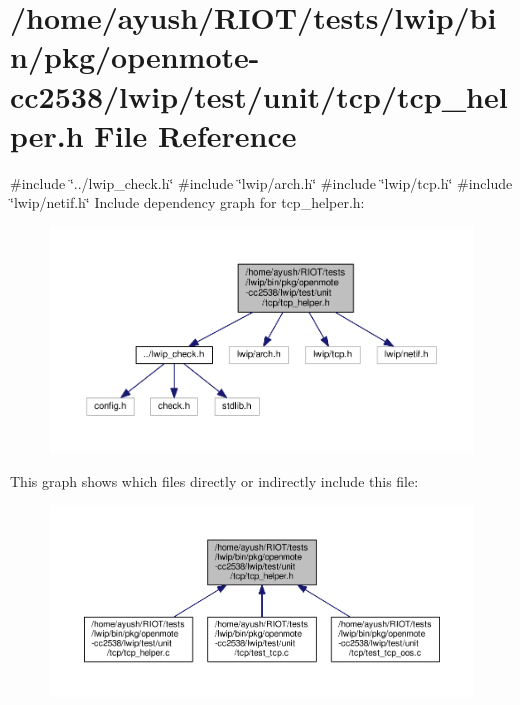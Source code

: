 \hypertarget{openmote-cc2538_2lwip_2test_2unit_2tcp_2tcp__helper_8h}{}\section{/home/ayush/\+R\+I\+O\+T/tests/lwip/bin/pkg/openmote-\/cc2538/lwip/test/unit/tcp/tcp\+\_\+helper.h File Reference}
\label{openmote-cc2538_2lwip_2test_2unit_2tcp_2tcp__helper_8h}
{\ttfamily \#include \char`\"{}../lwip\+\_\+check.\+h\char`\"{}}\newline
{\ttfamily \#include \char`\"{}lwip/arch.\+h\char`\"{}}\newline
{\ttfamily \#include \char`\"{}lwip/tcp.\+h\char`\"{}}\newline
{\ttfamily \#include \char`\"{}lwip/netif.\+h\char`\"{}}\newline
Include dependency graph for tcp\+\_\+helper.\+h\+:
\nopagebreak
\begin{figure}[H]
\begin{center}
\leavevmode
\includegraphics[width=350pt]{openmote-cc2538_2lwip_2test_2unit_2tcp_2tcp__helper_8h__incl}
\end{center}
\end{figure}
This graph shows which files directly or indirectly include this file\+:
\nopagebreak
\begin{figure}[H]
\begin{center}
\leavevmode
\includegraphics[width=350pt]{openmote-cc2538_2lwip_2test_2unit_2tcp_2tcp__helper_8h__dep__incl}
\end{center}
\end{figure}
